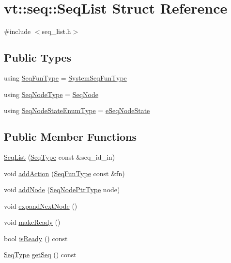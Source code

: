 \hypertarget{structvt_1_1seq_1_1_seq_list}{}\section{vt\+:\+:seq\+:\+:Seq\+List Struct Reference}
\label{structvt_1_1seq_1_1_seq_list}


{\ttfamily \#include $<$seq\+\_\+list.\+h$>$}

\subsection*{Public Types}
\begin{DoxyCompactItemize}
\item 
using \hyperlink{structvt_1_1seq_1_1_seq_list_afa5aacad3530e543d1ea016acbfb1cbb}{Seq\+Fun\+Type} = \hyperlink{namespacevt_1_1seq_a80eeb50c74a4a3bd46fcf4d5213c5ebe}{System\+Seq\+Fun\+Type}
\item 
using \hyperlink{structvt_1_1seq_1_1_seq_list_a3a95b02ac8cc454e44abfd249f665256}{Seq\+Node\+Type} = \hyperlink{structvt_1_1seq_1_1_seq_node}{Seq\+Node}
\item 
using \hyperlink{structvt_1_1seq_1_1_seq_list_a0e985bbbf299669fbc45bc693b663d89}{Seq\+Node\+State\+Enum\+Type} = \hyperlink{namespacevt_1_1seq_ad7b0496818667d816e00f717491d3b92}{e\+Seq\+Node\+State}
\end{DoxyCompactItemize}
\subsection*{Public Member Functions}
\begin{DoxyCompactItemize}
\item 
\hyperlink{structvt_1_1seq_1_1_seq_list_a02c8fa7eb677407f084df8e0e44443dc}{Seq\+List} (\hyperlink{namespacevt_1_1seq_a3b612da217ac669d39c159f134ab8434}{Seq\+Type} const \&seq\+\_\+id\+\_\+in)
\item 
void \hyperlink{structvt_1_1seq_1_1_seq_list_a73e746884a2f4181fe94a6aaf72e7b9b}{add\+Action} (\hyperlink{structvt_1_1seq_1_1_seq_list_afa5aacad3530e543d1ea016acbfb1cbb}{Seq\+Fun\+Type} const \&fn)
\item 
void \hyperlink{structvt_1_1seq_1_1_seq_list_a3dd63f53576d65c85eb840d1ac4ddb27}{add\+Node} (\hyperlink{namespacevt_1_1seq_ae6a4874b585be0612aaca32ca6d2d191}{Seq\+Node\+Ptr\+Type} node)
\item 
void \hyperlink{structvt_1_1seq_1_1_seq_list_a248ddc60ef237ccc041e9fb66881457f}{expand\+Next\+Node} ()
\item 
void \hyperlink{structvt_1_1seq_1_1_seq_list_a4b61d77fef5723835e70d62c65bbc758}{make\+Ready} ()
\item 
bool \hyperlink{structvt_1_1seq_1_1_seq_list_a05b00ac5a6b957354c0ec8af681909b6}{is\+Ready} () const
\item 
\hyperlink{namespacevt_1_1seq_a3b612da217ac669d39c159f134ab8434}{Seq\+Type} \hyperlink{structvt_1_1seq_1_1_seq_list_ab1ddc27b4429eb899519bb75335d0882}{get\+Seq} () const
\end{DoxyCompactItemize}
